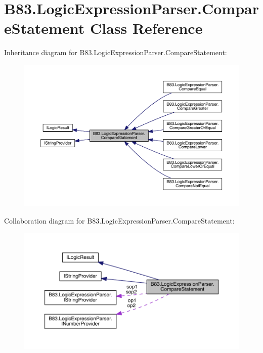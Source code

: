 \hypertarget{class_b83_1_1_logic_expression_parser_1_1_compare_statement}{}\section{B83.\+Logic\+Expression\+Parser.\+Compare\+Statement Class Reference}
\label{class_b83_1_1_logic_expression_parser_1_1_compare_statement}


Inheritance diagram for B83.\+Logic\+Expression\+Parser.\+Compare\+Statement\+:\nopagebreak
\begin{figure}[H]
\begin{center}
\leavevmode
\includegraphics[width=350pt]{class_b83_1_1_logic_expression_parser_1_1_compare_statement__inherit__graph}
\end{center}
\end{figure}


Collaboration diagram for B83.\+Logic\+Expression\+Parser.\+Compare\+Statement\+:\nopagebreak
\begin{figure}[H]
\begin{center}
\leavevmode
\includegraphics[width=350pt]{class_b83_1_1_logic_expression_parser_1_1_compare_statement__coll__graph}
\end{center}
\end{figure}

